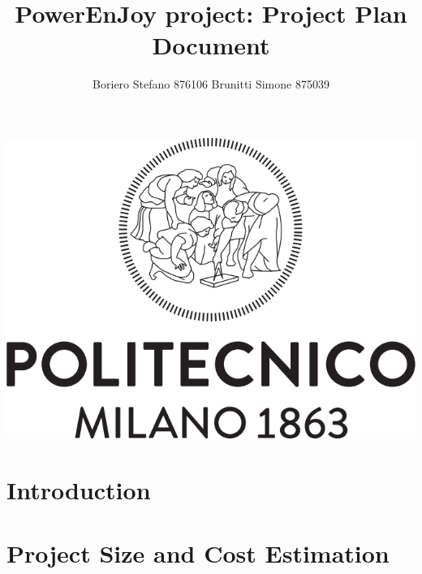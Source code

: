 \documentclass{article}
\begin{document}
\title{\textbf{{\Huge PowerEnJoy project: Project Plan Document}}}
\author{\begin{large}
Boriero Stefano  876106  
Brunitti Simone   875039
\end{large} }


\maketitle
\includegraphics[scale=0.5]{Logo_Politecnico_Milano.png} 
\newpage
\tableofcontents

\newpage

\section{Introduction}

\section{Project Size and Cost Estimation}
\end{document}
